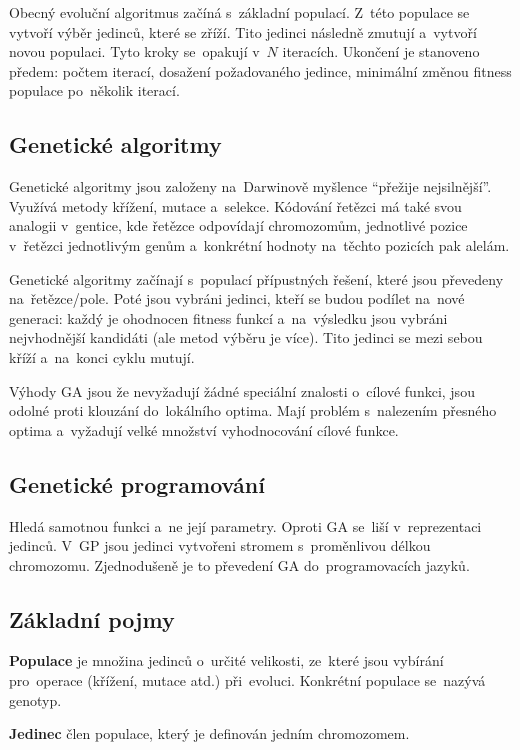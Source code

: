 Obecný evoluční algoritmus začíná s~základní populací. Z~této populace se vytvoří výběr jedinců, které se zříží. Tito jedinci následně zmutují a~vytvoří novou populaci. Tyto kroky se~opakují v~$N$ iteracích. Ukončení je stanoveno předem: počtem iterací, dosažení požadovaného jedince, minimální změnou fitness populace po~několik iterací.

\subsection{Genetické algoritmy}

Genetické algoritmy jsou založeny na~Darwinově myšlence \enquote{přežije nejsilnější}. Využívá metody křížení, mutace a~selekce. Kódování řetězci má také svou analogii v~gentice, kde řetězce odpovídají chromozomům, jednotlivé pozice v~řetězci jednotlivým genům a~konkrétní hodnoty na~těchto pozicích pak alelám.

Genetické algoritmy začínají s~populací přípustných řešení, které jsou převedeny na~řetězce/pole. Poté jsou vybráni jedinci, kteří se budou podílet na~nové generaci: každý je ohodnocen fitness funkcí a~na~výsledku jsou vybráni nejvhodnější kandidáti (ale metod výběru je více). Tito jedinci se mezi sebou kříží a~na~konci cyklu mutují.

Výhody GA jsou že nevyžadují žádné speciální znalosti o~cílové funkci, jsou odolné proti klouzání do~lokálního optima. Mají problém s~nalezením přesného optima a~vyžadují velké množství vyhodnocování cílové funkce.

\subsection{Genetické programování}

Hledá samotnou funkci a~ne její parametry. Oproti GA se~liší v~reprezentaci jedinců. V~GP jsou jedinci vytvořeni stromem s~proměnlivou délkou chromozomu. Zjednodušeně je to převedení GA do~programovacích jazyků.

\subsection{Základní pojmy}

\textbf{Populace} je množina jedinců o~určité velikosti, ze~které jsou vybírání pro~operace (křížení, mutace atd.) při~evoluci. Konkrétní populace se~nazývá genotyp.

\textbf{Jedinec} člen populace, který je definován jedním chromozomem.

